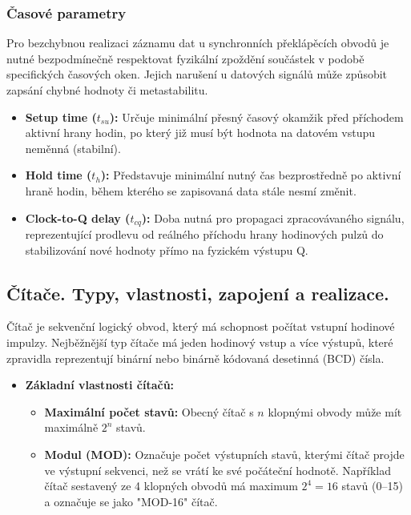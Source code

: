     \subsubsection{Časové parametry}
        Pro bezchybnou realizaci záznamu dat u synchronních překlápěcích obvodů je nutné bezpodmínečně respektovat fyzikální zpoždění součástek v podobě specifických časových oken. Jejich narušení u datových signálů může způsobit zapsání chybné hodnoty či metastabilitu.
        
        \begin{itemize}
            \item \textbf{Setup time ($t_{su}$):} Určuje minimální přesný časový okamžik před příchodem aktivní hrany hodin, po který již musí být hodnota na datovém vstupu neměnná (stabilní).
            \item \textbf{Hold time ($t_h$):} Představuje minimální nutný čas bezprostředně po aktivní hraně hodin, během kterého se zapisovaná data stále nesmí změnit.
            \item \textbf{Clock-to-Q delay ($t_{cq}$):} Doba nutná pro propagaci zpracovávaného signálu, reprezentující prodlevu od reálného příchodu hrany hodinových pulzů do stabilizování nové hodnoty přímo na fyzickém výstupu Q.
        \end{itemize}
\subsection{Čítače. Typy, vlastnosti, zapojení a realizace. }
        Čítač je sekvenční logický obvod, který má schopnost počítat vstupní hodinové impulzy. Nejběžnější typ čítače má jeden hodinový vstup a více výstupů, které zpravidla reprezentují binární nebo binárně kódovaná desetinná (BCD) čísla.
        
        \begin{itemize}
            \item \textbf{Základní vlastnosti čítačů:}
            \begin{itemize}
                \item \textbf{Maximální počet stavů:} Obecný čítač s $n$ klopnými obvody může mít maximálně $2^n$ stavů.
                \item \textbf{Modul (MOD):} Označuje počet výstupních stavů, kterými čítač projde ve výstupní sekvenci, než se vrátí ke své počáteční hodnotě. Například čítač sestavený ze 4 klopných obvodů má maximum $2^4 = 16$ stavů (0--15) a označuje se jako "MOD-16" čítač.
            \end{itemize}
        \end{itemize}
